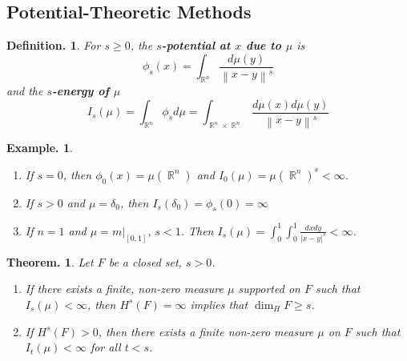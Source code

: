 \documentclass[11pt, a4paper]{memoir}
\DeclareMathOperator{\R}{{\mathbb{R}}}
\newcommand{\norm}[1]{\ensuremath{\left\lVert#1\right\rVert}}
\theoremstyle{change}
\newtheorem{theorem}{Theorem.}[section]
\theoremstyle{plain}
\theoremstyle{nonumberplain}
\newtheorem{definition}{Definition.}
\newtheorem{example}{Example.}
\newcommand{\defn}[1]{{\boldmath\bfseries #1}}
\numberwithin{equation}{section}
\begin{document}
\subsection{Potential-Theoretic Methods}
\begin{definition}
    For $s\geq 0$, the \defn{$s$-potential at $x$ due to $\mu$} is
    \begin{equation*}
        \phi_s(x)=\int_{\R^n}\frac{d\mu(y)}{\norm{x-y}^s}
    \end{equation*}
    and the \defn{$s$-energy of $\mu$}
    \begin{equation*}
        I_s(\mu)=\int_{\R^n}\phi_sd\mu=\int_{\R^n\times\R^n}\frac{d\mu(x)d\mu(y)}{\norm{x-y}^s}
    \end{equation*}
\end{definition}
\begin{example}
    \begin{enumerate}[nl,r]
        \item If $s=0$, then $\phi_0(x)=\mu(\R^n)$ and $I_0(\mu)=\mu(\R^n)^s<\infty$.
        \item If $s>0$ and $\mu=\delta_0$, then $I_s(\delta_0)=\phi_s(0)=\infty$
        \item If $n=1$ and $\mu=m|_{[0,1]}$, $s<1$.
            Then $I_s(\mu)=\int_0^1\int_0^1\frac{dxdy}{|x-y|^s}<\infty$.
    \end{enumerate}
\end{example}
\begin{theorem}
    Let $F$ be a closed set, $s>0$.
    \begin{enumerate}[nl,r]
        \item If there exists a finite, non-zero measure $\mu$ supported on $F$ such that $I_s(\mu)<\infty$, then $H^s(F)=\infty$ implies that $\dim_H F\geq s$.
        \item If $H^s(F)>0$, then there exists a finite non-zero measure $\mu$ on $F$ such that $I_t(\mu)<\infty$ for all $t<s$.
    \end{enumerate}
\end{theorem}
\end{document}
